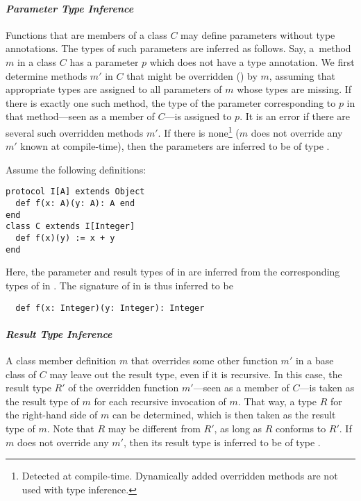 \paragraph{\em Parameter Type Inference}
Functions that are members of a class $C$ may define parameters without type annotations. The types of such parameters are inferred as follows. Say, a~method $m$ in a class $C$ has a parameter $p$ which does not have a type annotation. We first determine methods $m'$ in $C$ that might be overridden () by $m$, assuming that appropriate types are assigned to all parameters of $m$ whose types are missing. If there is exactly one such method, the type of the parameter corresponding to $p$ in that method---seen as a member of $C$---is assigned to $p$. It is an error if there are several such overridden methods $m'$. If there is none\footnote{Detected at compile-time. Dynamically added overridden methods are not used with type inference.} ($m$ does not override any $m'$ known at compile-time), then the parameters are inferred to be of type .

\example Assume the following definitions:
\begin{lstlisting}
protocol I[A] extends Object
  def f(x: A)(y: A): A end
end
class C extends I[Integer]
  def f(x)(y) := x + y
end
\end{lstlisting}
Here, the parameter and result types of \lstinline@f@ in \lstinline@C@ are inferred from the corresponding types of \lstinline@f@ in \lstinline@I@. The signature of \lstinline@f@ in \lstinline@C@ is thus inferred to be
\begin{lstlisting}
  def f(x: Integer)(y: Integer): Integer
\end{lstlisting}

\paragraph{\em Result Type Inference}
A class member definition $m$ that overrides some other function $m'$ in a base class of $C$ may leave out the result type, even if it is recursive. In this case, the result type $R'$ of the overridden function $m'$---seen as a member of $C$---is taken as the result type of $m$ for each recursive invocation of $m$. That way, a type $R$ for the right-hand side of $m$ can be determined, which is then taken as the result type of $m$. Note that $R$ may be different from $R'$, as long as $R$ conforms to $R'$. If $m$ does not override any $m'$, then its result type is inferred to be of type . 


